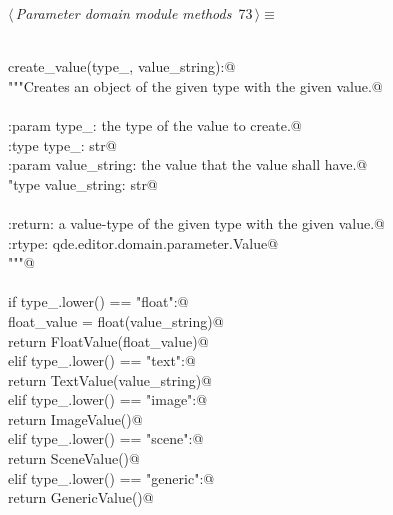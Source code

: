 \documentclass[
    a4paper,      %
    10pt,         %
    openright,    %
    notitlepage,  %
    parskip=half, %
]{scrreprt}       %
\theoremstyle{definition}                    %
\begin{document}
\begin{flushleft} \small
\begin{minipage}{\linewidth}\label{scrap119}\raggedright\small
{} $\langle\,${\itshape Parameter domain module methods}\nobreak\ {\footnotesize {73}}$\,\rangle\equiv$
\vspace{-1exm}
\begin{list}{}{} \item
\mbox{}\lstinline@@\\
\mbox{}\lstinline@def create_value(type_, value_string):@\\
\mbox{}\lstinline@    """Creates an object of the given type with the given value.@\\
\mbox{}\lstinline@@\\
\mbox{}\lstinline@    :param type_: the type of the value to create.@\\
\mbox{}\lstinline@    :type  type_: str@\\
\mbox{}\lstinline@    :param value_string: the value that the value shall have.@\\
\mbox{}\lstinline@    "type  value_string: str@\\
\mbox{}\lstinline@@\\
\mbox{}\lstinline@    :return: a value-type of the given type with the given value.@\\
\mbox{}\lstinline@    :rtype: qde.editor.domain.parameter.Value@\\
\mbox{}\lstinline@    """@\\
\mbox{}\lstinline@@\\
\mbox{}\lstinline@    if type_.lower() == "float":@\\
\mbox{}\lstinline@        float_value = float(value_string)@\\
\mbox{}\lstinline@        return FloatValue(float_value)@\\
\mbox{}\lstinline@    elif type_.lower() == "text":@\\
\mbox{}\lstinline@        return TextValue(value_string)@\\
\mbox{}\lstinline@    elif type_.lower() == "image":@\\
\mbox{}\lstinline@        return ImageValue()@\\
\mbox{}\lstinline@    elif type_.lower() == "scene":@\\
\mbox{}\lstinline@        return SceneValue()@\\
\mbox{}\lstinline@    elif type_.lower() == "generic":@\\
\mbox{}\lstinline@        return GenericValue()@\\

\end{list}
\end{minipage}
\end{flushleft}
\end{document}
